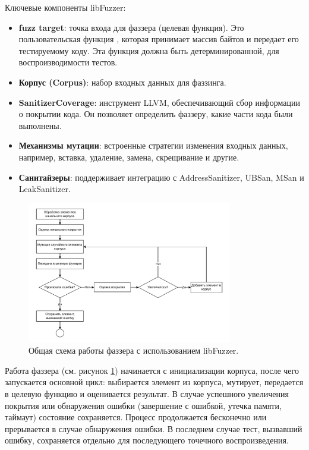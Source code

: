 Ключевые компоненты libFuzzer:
\begin{itemize}
	\item \textbf{fuzz target}: точка входа для фаззера (целевая функция). Это пользовательская функция , которая принимает массив байтов и передает его тестируемому коду. Эта функция должна быть детерминированной, для воспроизводимости тестов.
	\item \textbf{Корпус (Corpus)}: набор входных данных для фаззинга.
	\item \textbf{SanitizerCoverage}: инструмент LLVM, обеспечивающий сбор информации о покрытии кода. Он позволяет определить фаззеру, какие части кода были выполнены.
	\item \textbf{Механизмы мутации}: встроенные стратегии изменения входных данных, например, вставка, удаление, замена, скрещивание и другие.
	\item \textbf{Санитайзеры}: поддерживает интеграцию с AddressSanitizer, UBSan, MSan и LeakSanitizer.
\end{itemize}
\begin{figure}[htbp]
	\centering %
	\includegraphics[width=0.8\textwidth]{Piclibfuzz.pdf} %
	\caption{Общая схема работы фаззера с использованием libFuzzer.} %
	\label{intro:libfuzz} %
\end{figure}
Работа фаззера (см. рисунок \ref{intro:libfuzz}) начинается с инициализации корпуса, после чего запускается основной цикл: выбирается элемент из корпуса, мутирует, передается в целевую функцию и оценивается результат. В случае успешного увеличения покрытия или обнаружения ошибки (завершение с ошибкой, утечка памяти, таймаут) состояние сохраняется. Процесс продолжается бесконечно или прерывается в случае обнаружения ошибки. В последнем случае тест, вызвавший ошибку, сохраняется отдельно для последующего точечного воспроизведения.

